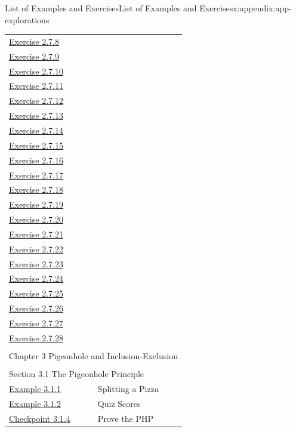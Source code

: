 \documentclass[oneside,10pt,]{book}
\numberwithin{equation}{section}
\begin{document}
\begin{appendixptx}{List of Examples and Exercises}{}{List of Examples and Exercises}{}{}{x:appendix:app-explorations}
\begin{longtable}[l]{ll}
\hyperlink{g:exercise:id475583}{Exercise 2.7.8}& \\
\hyperlink{g:exercise:id475742}{Exercise 2.7.9}& \\
\hyperlink{g:exercise:id475961}{Exercise 2.7.10}& \\
\hyperlink{g:exercise:id476020}{Exercise 2.7.11}& \\
\hyperlink{x:exercise:divex-3x3-grid}{Exercise 2.7.12}& \\
\hyperlink{g:exercise:id476363}{Exercise 2.7.13}& \\
\hyperlink{g:exercise:id476397}{Exercise 2.7.14}& \\
\hyperlink{g:exercise:id476538}{Exercise 2.7.15}& \\
\hyperlink{g:exercise:id476756}{Exercise 2.7.16}& \\
\hyperlink{g:exercise:id474558}{Exercise 2.7.17}& \\
\hyperlink{g:exercise:id474554}{Exercise 2.7.18}& \\
\hyperlink{g:exercise:id441145}{Exercise 2.7.19}& \\
\hyperlink{g:exercise:id441182}{Exercise 2.7.20}& \\
\hyperlink{g:exercise:id441272}{Exercise 2.7.21}& \\
\hyperlink{g:exercise:id441301}{Exercise 2.7.22}& \\
\hyperlink{g:exercise:id441345}{Exercise 2.7.23}& \\
\hyperlink{g:exercise:id441396}{Exercise 2.7.24}& \\
\hyperlink{g:exercise:id441397}{Exercise 2.7.25}& \\
\hyperlink{g:exercise:id441408}{Exercise 2.7.26}& \\
\hyperlink{g:exercise:id441426}{Exercise 2.7.27}& \\
\hyperlink{g:exercise:id441463}{Exercise 2.7.28}& \\
\multicolumn{2}{l}{\null}\\[1.5ex] \multicolumn{2}{l}{\large Chapter 3 Pigeonhole and Inclusion-Exclusion}\\[0.5ex]
\multicolumn{2}{l}{\null}\\[1.5ex] \multicolumn{2}{l}{\large Section 3.1 The Pigeonhole Principle}\\[0.5ex]
\hyperref[x:example:eg-php-pizza]{Example 3.1.1}& Splitting a Pizza\\
\hyperref[x:example:eg-php-quiz-scores]{Example 3.1.2}& Quiz Scores\\
\hyperref[x:exercise:ex-php-proof]{Checkpoint 3.1.4}& Prove the PHP\\

\end{longtable}
\end{appendixptx}
\end{document}
